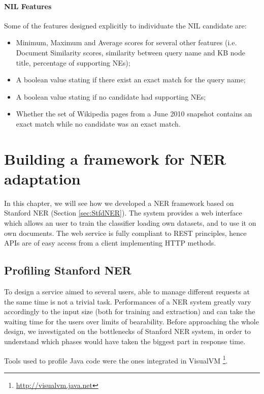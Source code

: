 \documentclass[a4paper,11pt]{report}
\begin{document}
\subsubsection{NIL Features}
Some of the features designed explicitly to individuate the NIL candidate are:
\begin{itemize}
\item Minimum, Maximum and Average scores for several other features (i.e. Document Similarity scores, similarity between query name and KB node title, percentage of supporting NEs);
\item A boolean value stating if there exist an exact match for the query name;
\item A boolean value stating if no candidate had supporting NEs;
\item Whether the set of Wikipedia pages from a June 2010 snapshot contains an exact match while no candidate was an exact match.
\end{itemize}


\chapter{Building a framework for NER adaptation}

In this chapter, we will see how we developed a NER framework based on Stanford NER (Section \ref{sec:StfdNER}). The system provides a web interface which allows an user to train the classifier loading own datasets, and to use it on own documents. %
The web service is fully compliant to REST principles, %
hence APIs are of easy access from a client implementing HTTP methods. 

\section{Profiling Stanford NER}
To design a service aimed to several users, able to manage different requests at the same time is not a trivial task. Performances of a NER system greatly vary accordingly to the input size (both for training and extraction) and can take the waiting time for the users over limits of bearability. Before approaching the whole design, we investigated on the bottlenecks of Stanford NER system, in order to understand which phases would have taken the biggest part in response time.

Tools used to profile Java code were the ones integrated in VisualVM \footnote{\url{http://visualvm.java.net}}.
\end{document}
